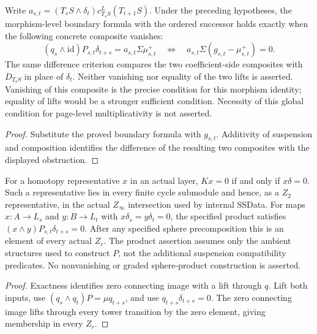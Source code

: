 \begin{proposition}
  \label{prop:h6-ordered-right-boundary-obstruction}
  \leanok
  Write $a_{s,t}=(T_sS\wedge\delta_t)c_{T_sS}^L(T_{t+1}S)$.
  Under the preceding hypotheses, the morphism-level boundary formula with the
  ordered successor holds exactly when the following concrete composite
  vanishes:
  \[
    (q_s\wedge\mathrm{id})P_{s,t}\delta_{t+s}
         =a_{s,t}\Sigma\mu^+_{s,t}
    \quad\Longleftrightarrow\quad
    a_{s,t}\Sigma(g_{s,t}-\mu^+_{s,t})=0.
  \]
  The same difference criterion compares the two coefficient-side
  composites with $D_{T_tS}$ in place of $\delta_t$.
  Neither vanishing nor equality of the two lifts is asserted. Vanishing
  of this composite is the precise condition for this morphism identity;
  equality of lifts would be a stronger sufficient condition. Necessity
  of this global condition for page-level multiplicativity is not asserted.
\end{proposition}
\begin{proof}
  Substitute the proved boundary formula with $g_{s,t}$. Additivity of
  suspension and composition identifies the difference of the resulting
  two composites with the displayed obstruction.
  \leanok
\end{proof}

\begin{proposition}
  \label{prop:h6-product-tower-image-cycles}
  \leanok
  For a homotopy representative $x$ in an actual layer, $Kx=0$ if and
  only if $x\delta=0$. Such a representative lies in every finite cycle
  submodule and hence, as a $Z_2$ representative, in the actual $Z_\infty$
  intersection used by internal SSData. For maps $x:A\to L_s$ and $y:B\to L_t$ with
  $x\delta_s=y\delta_t=0$, the specified product satisfies
  $(x\wedge y)P_{s,t}\delta_{t+s}=0$. After any specified sphere
  precomposition this is an element of every actual $Z_r$.
  The product assertion assumes only the ambient structures used to
  construct $P$, not the additional suspension compatibility predicates.
  No nonvanishing or graded sphere-product construction is asserted.
\end{proposition}
\begin{proof}
  Exactness identifies zero connecting image with a lift through $q$.
  Lift both inputs, use $(q_s\wedge q_t)P=\mu q_{t+s}$, and use
  $q_{t+s}\delta_{t+s}=0$. The zero connecting image lifts through every
  tower transition by the zero element, giving membership in every $Z_r$.
  \leanok
\end{proof}

